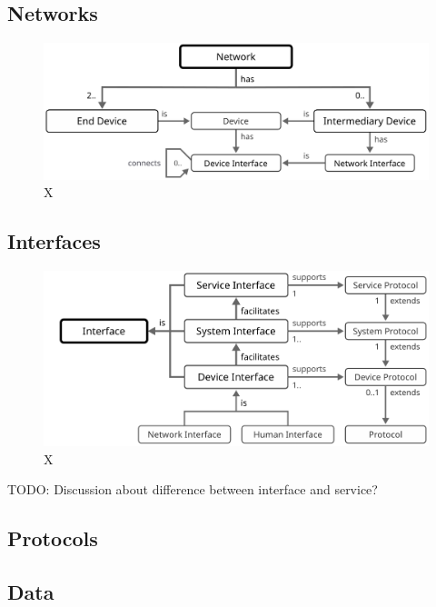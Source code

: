 \subsection{Networks}

\begin{figure}[ht!]
  \centering
  \includegraphics{figures/network}
  \caption{
    X
  }
  \label{fig:network}
\end{figure}

\subsection{Interfaces}

\begin{figure}[ht!]
  \centering
  \includegraphics{figures/interface}
  \caption{
    X
  }
  \label{fig:interface}
\end{figure}

TODO: Discussion about difference between interface and service?

\subsection{Protocols}

\subsection{Data}
